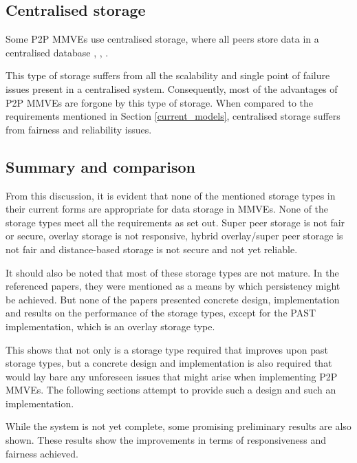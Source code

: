 \documentclass[10pt,a4paper,conference]{IEEEtran}
\begin{document}

\subsection{Centralised storage}

Some P2P MMVEs use centralised storage, where all peers store data in a centralised database \cite{badumna_engine},
\cite{rooney_centralised_storage}, \cite{hybrid_p2p_cs_centralised}.

This type of storage suffers from all the scalability and single point of failure issues present in a centralised system. Consequently, most of the
advantages of P2P MMVEs are forgone by this type of storage. When compared to the requirements mentioned in Section \ref{current_models}, centralised
storage suffers from fairness and reliability issues.



\subsection{Summary and comparison}

From this discussion, it is evident that none of the mentioned storage types in their current forms are appropriate for data storage in MMVEs. None
of the storage types meet all the requirements as set out. Super peer storage is not fair or secure, overlay storage is not responsive, hybrid
overlay/super peer storage is not fair and distance-based storage is not secure and not yet reliable.

It should also be noted that most of these storage types are not mature. In the referenced papers, they were mentioned as a means by which
persistency might be achieved. But none of the papers presented concrete design, implementation and results on the performance of the storage types,
except for the PAST implementation, which is an overlay storage type.

This shows that not only is a storage type required that improves upon past storage types, but a concrete design and implementation is also required
that would lay bare any unforeseen issues that might arise when implementing P2P MMVEs. The following sections attempt to provide such a design and
such an implementation.

While the system is not yet complete, some promising preliminary results are also shown. These results show the improvements in terms of
responsiveness and fairness achieved.
\end{document}
